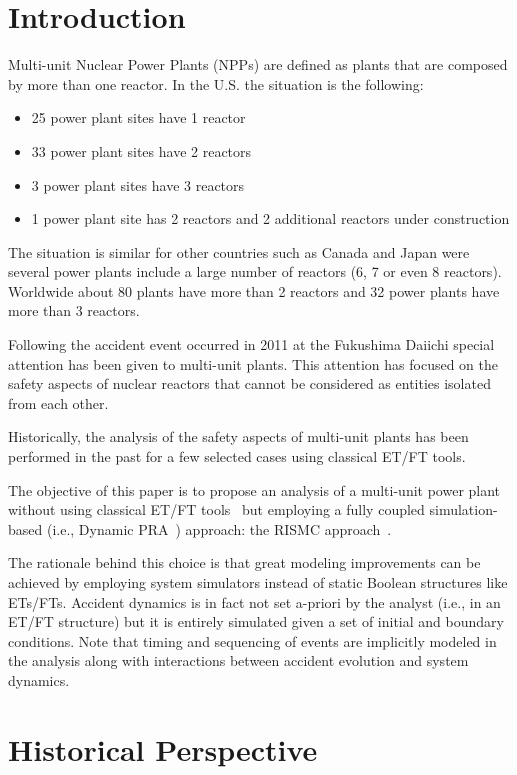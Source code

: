 \section{Introduction}
\label{sec:introduction}

Multi-unit Nuclear Power Plants (NPPs) are defined as plants that are composed by 
more than one reactor. In the U.S. the situation is the following:
\begin{itemize}
  \item 25 power plant sites have 1 reactor
  \item 33 power plant sites have 2 reactors
  \item 3 power plant sites have 3 reactors
  \item 1 power plant site has 2 reactors and 2 additional reactors under construction
\end{itemize}
The situation is similar for other countries such as Canada and Japan were 
several power plants include a large number of reactors (6, 7 or even 8 reactors). 
Worldwide about 80 plants have more than 2 reactors and 32 power plants have more 
than 3 reactors. 

Following the accident event occurred in 2011 at the Fukushima Daiichi special 
attention has been given to multi-unit plants. This attention has focused on the 
safety aspects of nuclear reactors that cannot be considered as entities isolated 
from each other. 

Historically, the analysis of the safety aspects of multi-unit plants has been performed 
in the past for a few selected cases using classical ET/FT tools. 

The objective of this paper is to propose an analysis of a multi-unit power 
plant without using classical ET/FT tools~\cite{Nureg1150} but employing a fully 
coupled simulation-based (i.e., Dynamic PRA~\cite{DynamicReliabilityMonteCarlo}) approach: 
the RISMC approach~\cite{RISMC,mandelliNewAlgo}. 

The rationale behind this choice is that great modeling improvements can be achieved by 
employing system simulators instead of static Boolean structures like ETs/FTs. 
Accident dynamics is in fact not set a-priori by the analyst (i.e., in an ET/FT 
structure) but it is entirely simulated given a set of initial and boundary conditions. 
Note that timing and sequencing of events are implicitly modeled in the analysis along 
with interactions between accident evolution and system dynamics.

\section{Historical Perspective}
\label{sec:historicalPerspective}

